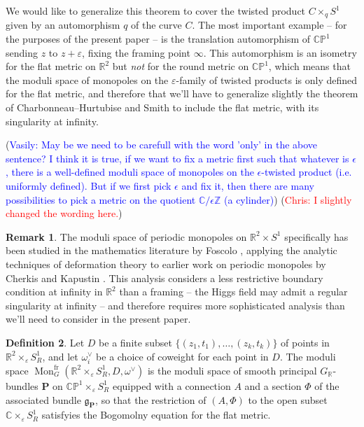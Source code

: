 \documentclass[11pt, oneside, reqno]{amsart}
\theoremstyle{definition} \newtheorem{definition}{Definition}[section]
\theoremstyle{definition} \newtheorem{remark}[definition]{Remark}
\theoremstyle{definition} \newtheorem{remarks}[definition]{Remarks}
\theoremstyle{definition} \newtheorem{question}[definition]{Question}
\theoremstyle{definition} \newtheorem*{note}{Note}
\theoremstyle{definition} \newtheorem{example}[definition]{Example}
\theoremstyle{definition} \newtheorem{examples}[definition]{Examples}
\renewcommand{\gg}{\mathfrak{g}}
\newcommand{\bb}[1]{\mathbb{#1}}
\newcommand{\bo}[1]{\boldsymbol{#1}}
\newcommand{\CC}{\mathbb{C}}
\newcommand{\RR}{\mathbb{R}}
\newcommand{\eps}{\varepsilon}
\DeclareMathOperator{\mon}{Mon}
\newcommand{\fr}{\mathrm{fr}}
\newcommand{\chris}[1]{(\textcolor{red}{Chris: #1})}
\newcommand{\vasily}[1]{(\textcolor{blue}{Vasily: #1})}
\begin{document}
We would like to generalize this theorem to cover the twisted product $C \times_q S^1$ given by an automorphism $q$ of the curve $C$.  The most important example -- for the purposes of the present paper -- is the translation automorphism of $\bb{CP}^1$ sending $z$ to $z + \eps$, fixing the framing point $\infty$.  This automorphism is an isometry for the flat metric on $\RR^2$ but \emph{not} for the round metric on $\bb{CP}^1$, which means that the moduli space of monopoles on the $\eps$-family of twisted products is only defined for the flat metric, and therefore that we'll have to generalize slightly the theorem of Charbonneau--Hurtubise and Smith to include the flat metric, with its singularity at infinity.

\vasily{May be we need to be carefull with the word 'only' in the above
  sentence? I think it is true, if we want to fix a metric first such
  that whatever is $\epsilon$, there is a well-defined moduli space of monopoles
  on the $\epsilon$-twisted product (i.e. uniformly defined). But if we
  first pick $\epsilon$ and fix it,  then there are many possibilities
to pick a metric on the quotient $\mathbb{C}/\epsilon \mathbb{Z}$ (a cylinder)} \chris{I slightly changed the wording here.}

\begin{remark}
The moduli space of periodic monopoles on $\RR^2 \times S^1$ specifically has been studied in the mathematics literature by Foscolo \cite{FoscoloDef} , applying the analytic techniques of deformation theory to earlier work on periodic monopoles by Cherkis and Kapustin \cite{CherkisKapustin1, CherkisKapustin2}. This analysis considers a less restrictive boundary condition at infinity in $\RR^2$ than a framing -- the Higgs field may admit a regular singularity at infinity -- and therefore requires more sophisticated analysis than we'll need to consider in the present paper.
\end{remark}

\begin{definition} \label{monopole_moduli_def}
Let $D$ be a finite subset $\{(z_1,t_1), \ldots, (z_k, t_k)\}$ of points in $\RR^2 \times_\eps S^1_R$, and let $\omega^\vee_{i}$ be a choice of coweight for each point in $D$. The moduli space $\mon^\fr_G(\RR^2 \times_\eps S^1_R, D, \omega^\vee)$ is the moduli space of smooth principal $G_\RR$-bundles $\bo P$ on $\bb{CP}^1 \times_\eps S^1_R$ equipped with a connection $A$ and a section $\Phi$ of the associated bundle $\gg_{\bo P}$, so that the restriction of $(A,\Phi)$ to the open subset $\CC \times_\eps S^1_R$ satisfyies the Bogomolny equation for the flat metric.
\end{definition}
\end{document}
